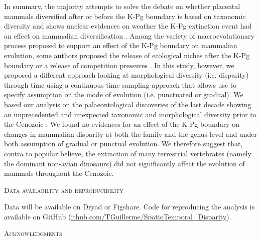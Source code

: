 \documentclass[12pt,letterpaper]{article}
\renewcommand{\section}[1]{%
\bigskip
\begin{center}
\begin{Large}
\normalfont\scshape #1
\medskip
\end{Large}
\end{center}}
\begin{document}
In summary, the majority attempts to solve the debate on whether placental mammals diversified after or before the K-Pg boundary is based on taxonomic diversity and shows unclear evidences on weather the K-Pg extinction event had an effect on mammalian diversification \citep{meredithimpacts2011,O'Leary08022013,dosReis2014,beckancient2014}.
Among the variety of macroevolutionary process proposed to support an effect of the K-Pg boundary on mammalian evolution, some authors proposed the release of ecological niches after the K-Pg boundary \citep[e.g.][]{archibald2011extinction,O'Leary08022013} or a release of competition pressures \citep[e.g.][]{Slater2012MEE,Lovergrove}.
In this study, however, we proposed a different approach looking at morphological diversity (i.e. disparity) through time using a continuous time sampling approach that allows use to specify assumption on the mode of evolution (i.e. punctuated or gradual).
We based our analysis on the palaeontological discoveries of the last decade showing an unprecedented and unexpected taxonomic and morphological diversity prior to the Cenozoic \citep{luo2007,Close2015}.
We found no evidences for an effect of the K-Pg boundary on changes in mammalian disparity at both the family and the genus level and under both assumption of gradual or punctual evolution.
We therefore suggest that, contra to popular believe, the extinction of many terrestrial vertebrates (namely the dominant non-avian dinosaurs) did not significantly affect the evolution of mammals throughout the Cenozoic.


\section{Data availability and reproducibility}
Data will be available on Dryad or Figshare.
Code for reproducing the analysis is available on GitHub (\url{ithub.com/TGuillerme/SpatioTemporal_Disparity}).

\section{Acknowledgments}
\end{document}
